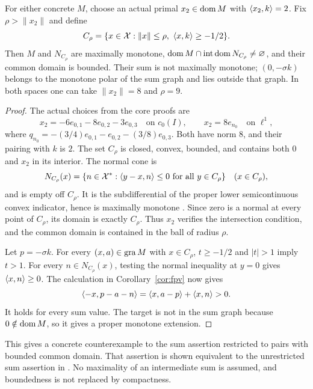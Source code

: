 \begin{corollary}\label{cor:normal}
For either concrete $M$, choose an actual primal $x_2\in\operatorname{dom} M$ with
$\langle x_2,k\rangle=2$. Fix $\rho>\|x_2\|$ and define
\begin{equation}
C_\rho=\{x\in\mathcal X:\|x\|\le\rho,\ \langle x,k\rangle\ge-1/2\}.
\label{eq:cor-cut}
\end{equation}
Then $M$ and $N_{C_\rho}$ are maximally monotone,
$\operatorname{dom} M\cap\operatorname{int}\operatorname{dom} N_{C_\rho}\ne\varnothing$, and
their common domain is bounded. Their sum is not maximally monotone;
$(0,-\sigma k)$ belongs to the monotone polar of the sum graph
and lies outside that graph.
In both spaces one can take $\|x_2\|=8$ and $\rho=9$.
\end{corollary}
\begin{proof}
The actual choices from the core proofs are
\[
x_2=-6e_{0,1}-8e_{0,2}-3e_{0,3}\quad\text{on }c_0(I),
\qquad x_2=8e_{n_0}\quad\text{on }\ell^1,
\]
where $q_{n_0}=-(3/4)e_{0,1}-e_{0,2}-(3/8)e_{0,3}$. Both have norm
$8$, and their pairing with $k$ is $2$. The set $C_\rho$ is closed,
convex, bounded, and contains both $0$ and
$x_2$ in its interior. The normal cone is
\[
N_{C_\rho}(x)=\{n\in\mathcal X^*:
\langle y-x,n\rangle\le0\ \text{for all }y\in C_\rho\}
\quad(x\in C_\rho),
\]
and is empty off $C_\rho$. It is the subdifferential of the proper
lower semicontinuous convex indicator, hence is maximally monotone
\cite[Theorem~A]{rockafellar1970subdiff}. Since zero is a normal at
every point of $C_\rho$, its domain is exactly $C_\rho$.
Thus $x_2$ verifies the intersection condition, and the common domain
is contained in the ball of radius $\rho$.

Let $p=-\sigma k$. For every $(x,a)\in\operatorname{gra} M$ with $x\in C_\rho$,
$t\ge-1/2$ and $|t|>1$ imply $t>1$. For every $n\in N_{C_\rho}(x)$,
testing the normal inequality at $y=0$ gives $\langle x,n\rangle\ge0$.
The calculation in Corollary~\ref{cor:fpv} now gives
\[
\langle -x,p-a-n\rangle=\langle x,a-p\rangle+\langle x,n\rangle>0.
\]
It holds for every sum value. The target is not in the sum graph because
$0\notin\operatorname{dom} M$, so it gives a proper monotone extension.
\end{proof}
This gives a concrete counterexample to the sum assertion restricted to
pairs with bounded common domain. That assertion is shown equivalent to
the unrestricted sum assertion in \cite[Theorem~2]{botbuenosimons2016}. No maximality of an intermediate
sum is assumed, and boundedness is not replaced by compactness.

